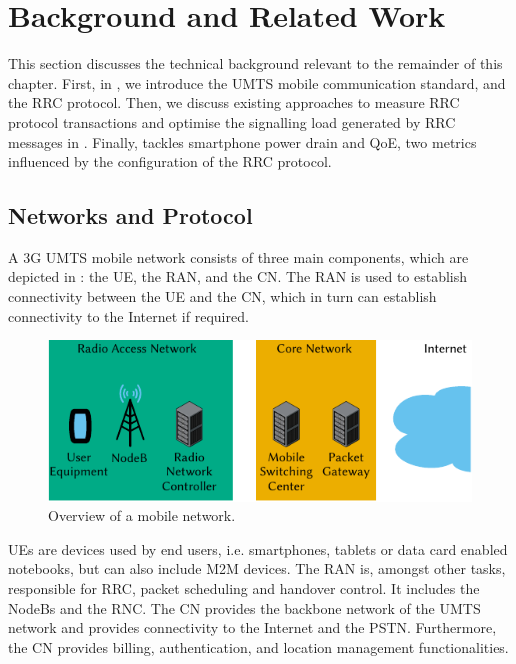 \section{Background and Related Work}\label{sec:network:background}
This section discusses the technical background relevant to the remainder of this chapter.
First, in , we introduce the \gls{UMTS} mobile communication standard, and the \gls{RRC} protocol.
Then, we discuss existing approaches to measure \gls{RRC} protocol transactions and optimise the signalling load generated by \gls{RRC} messages in .
Finally,  tackles smartphone power drain and \gls{QoE}, two metrics influenced by the configuration of the \gls{RRC} protocol.

\subsection{ Networks and  Protocol}\label{sec:network:background:umts_rrc}
A \gls{3G} \gls{UMTS} mobile network consists of three main components, which are depicted in : the \gls{UE}, the \gls{RAN}, and the \gls{CN}.
The \gls{RAN} is used to establish connectivity between the \gls{UE} and the \gls{CN}, which in turn can establish connectivity to the Internet if required.

\begin{figure}
	\centering
	\includegraphics{network/background/figures/mobile_network_overview}
	\caption{Overview of a mobile network.}
	\label{fig:network:background:mobile_network_overview}
\end{figure}

\glspl{UE} are devices used by end users, i.e. smartphones, tablets or data card enabled notebooks, but can also include \gls{M2M} devices.
The \gls{RAN} is, amongst other tasks, responsible for \gls{RRC}, packet scheduling and handover control.
It includes the \glspl{NodeB} and the \gls{RNC}.
The \gls{CN} provides the backbone network of the \gls{UMTS} network and provides connectivity to the Internet and the \gls{PSTN}.
Furthermore, the \gls{CN} provides billing, authentication, and location management functionalities.

